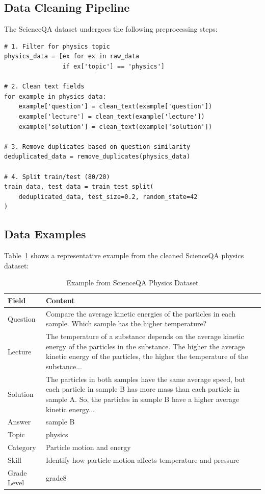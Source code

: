 \documentclass[11pt,a4paper]{article}
\begin{document}
\subsection{Data Cleaning Pipeline}

The ScienceQA dataset undergoes the following preprocessing steps:

\begin{lstlisting}[caption=ScienceQA Preprocessing Steps]
# 1. Filter for physics topic
physics_data = [ex for ex in raw_data 
                if ex['topic'] == 'physics']

# 2. Clean text fields
for example in physics_data:
    example['question'] = clean_text(example['question'])
    example['lecture'] = clean_text(example['lecture'])
    example['solution'] = clean_text(example['solution'])

# 3. Remove duplicates based on question similarity
deduplicated_data = remove_duplicates(physics_data)

# 4. Split train/test (80/20)
train_data, test_data = train_test_split(
    deduplicated_data, test_size=0.2, random_state=42
)
\end{lstlisting}

\subsection{Data Examples}

Table~\ref{tab:data_example} shows a representative example from the cleaned ScienceQA physics dataset:

\begin{table}[H]
\centering
\small
\begin{tabular}{p{3cm}p{10cm}}
\toprule
\textbf{Field} & \textbf{Content} \\
\midrule
Question & Compare the average kinetic energies of the particles in each sample. Which sample has the higher temperature? \\
\midrule
Lecture & The temperature of a substance depends on the average kinetic energy of the particles in the substance. The higher the average kinetic energy of the particles, the higher the temperature of the substance... \\
\midrule
Solution & The particles in both samples have the same average speed, but each particle in sample B has more mass than each particle in sample A. So, the particles in sample B have a higher average kinetic energy... \\
\midrule
Answer & sample B \\
\midrule
Topic & physics \\
\midrule
Category & Particle motion and energy \\
\midrule
Skill & Identify how particle motion affects temperature and pressure \\
\midrule
Grade Level & grade8 \\
\bottomrule
\end{tabular}
\caption{Example from ScienceQA Physics Dataset}
\label{tab:data_example}
\end{table}
\end{document}
